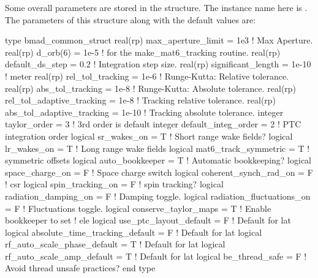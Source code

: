 Some overall parameters are stored in the 
structure. The instance name here is . The parameters of
this structure along with the default values are:
\begin{example}
  type bmad_common_struct
    real(rp) max_aperture_limit = 1e3          ! Max Aperture.
    real(rp) d_orb(6)           = 1e-5         ! for the make_mat6_tracking routine.
    real(rp) default_ds_step    = 0.2          ! Integration step size.  
    real(rp) significant_length = 1e-10        ! meter 
    real(rp) rel_tol_tracking = 1e-6           ! Runge-Kutta: Relative tolerance.
    real(rp) abs_tol_tracking = 1e-8           ! Runge-Kutta: Absolute tolerance.
    real(rp) rel_tol_adaptive_tracking = 1e-8  ! Tracking relative tolerance.
    real(rp) abs_tol_adaptive_tracking = 1e-10 ! Tracking absolute tolerance.
    integer taylor_order = 3                   ! 3rd order is default
    integer default_integ_order = 2            ! PTC integration order
    logical sr_wakes_on = T                    ! Short range wake fields?
    logical lr_wakes_on = T                    ! Long range wake fields
    logical mat6_track_symmetric = T           ! symmetric offsets
    logical auto_bookkeeper = T                ! Automatic bookkeeping?
    logical space_charge_on = F                ! Space charge switch
    logical coherent_synch_rad_on = F          ! csr 
    logical spin_tracking_on = F               ! spin tracking?
    logical radiation_damping_on = F           ! Damping toggle.
    logical radiation_fluctuations_on = F      ! Fluctuations toggle.
    logical conserve_taylor_maps = T           ! Enable bookkeeper to set
                                               ! ele%
    logical use_ptc_layout_default = F         ! Default for lat%
    logical absolute_time_tracking_default = F ! Default for lat%
    logical rf_auto_scale_phase_default = T    ! Default for lat%
    logical rf_auto_scale_amp_default = T      ! Default for lat%
    logical be_thread_safe = F                 ! Avoid thread unsafe practices?
  end type
\end{example}

